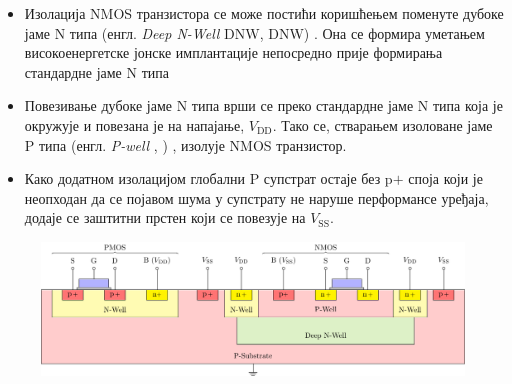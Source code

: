 \documentclass[aspectratio=169]{beamer}
\makeatletter
\newcommand*{\engl}[2][\@empty]{%
    \edef\theacronym{#1}%
    (енгл. \foreignlanguage{english}{\emph{#2}%
    \ifx\theacronym\@empty \else , #1\fi})%
}
\makeatother
\begin{document}
\begin{frame}{\secname}
	\small
	\begin{itemize}
		\item Изолација NMOS транзистора се може постићи коришћењем поменуте дубоке јаме N типа \engl[DNW]{Deep N-Well}. Она се формира уметањем високоенергетске јонске имплантације непосредно прије формирања стандардне јаме N типа
		\item Повезивање дубоке јаме N типа врши се преко стандардне јаме N типа која је окружује и повезана је на напајање, $V_\text{DD}$. Тако се, стварањем изоловане јаме P типа \engl{P-well}, изолује NMOS транзистор.
		\item Како додатном изолацијом глобални P супстрат остаје без p$+$ споја који је неопходан да се појавом шума у супстрату не наруше перформансе уређаја, додаје се заштитни прстен који се повезује на $V_\text{SS}$.
	\end{itemize}
	\vspace{-0.3cm}
        \begin{figure}[!t]
        	\centering
            	\includegraphics[scale=0.6]{slike/prezentacija/dnw2.pdf}
        \end{figure}
\end{frame}
\end{document}
